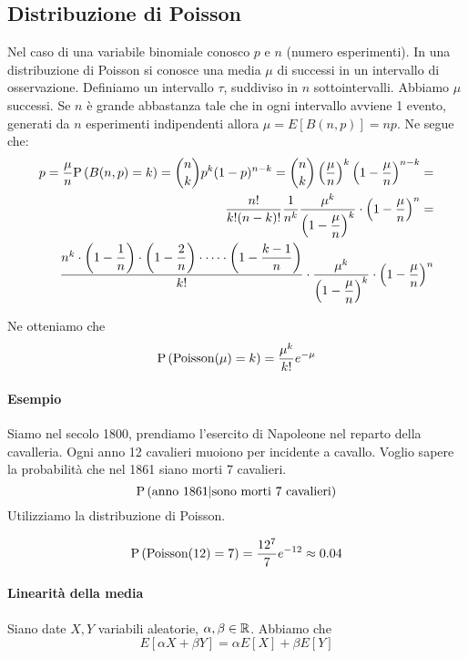 \subsection{Distribuzione di Poisson}
Nel caso di una variabile binomiale conosco $ p $ e $ n $ (numero esperimenti).
In una distribuzione di Poisson si conosce una media $ \mu $ di successi in un intervallo di osservazione.
Definiamo un intervallo $ \tau $, suddiviso in $ n $ sottointervalli. Abbiamo $ \mu $ successi. Se $ n $ è grande abbastanza tale che in ogni intervallo avviene 1 evento, generati da $ n $ esperimenti indipendenti allora $ \mu = E[B(n,p)] = np$. Ne segue che:
\[
\begin{aligned}
 p = \dfrac{\mu}{n} 
 \text{P}\left(B(n,p) = k\right) = \binom{n}{k}p^k(1-p)^{n-k} = \binom{n}{k} \left(\dfrac{\mu}{n}\right)^k \left(1- \dfrac{\mu}{n}\right)^{n-k} 
 = \\ \dfrac{n!}{k!(n-k)!} \dfrac{1}{n^k} \dfrac{\mu^k}{\left(1-\dfrac{\mu}{n}\right)^k} \cdot \left(1-\dfrac{\mu}{n}\right)^n  
 = \\ \dfrac{n^k \cdot \left(1-\dfrac{1}{n} \right) \cdot \left(1-\dfrac{2}{n}\right) \cdot \dots \cdot \left(1- \dfrac{k-1}{n}\right)}{k!} \cdot \dfrac{\mu^k}{\left(1-\dfrac{\mu}{n}\right)^k} \cdot \left(1-\dfrac{\mu}{n}\right)^n 
\end{aligned}\]

Ne otteniamo che 
\[ \text{P}\left(\text{Poisson}(\mu) = k\right) = \dfrac{\mu^k}{k!} e^{-\mu} \]


\paragraph{Esempio}
Siamo nel secolo 1800, prendiamo l'esercito di Napoleone nel reparto della cavalleria. Ogni anno 12 cavalieri muoiono per incidente a cavallo. Voglio sapere la probabilità che nel 1861 siano morti 7 cavalieri.
\[ \text{P}\left(\text{anno } 1861 | \text{sono morti 7 cavalieri}\right) \]
Utilizziamo la distribuzione di Poisson.

\[ \text{P}\left(\text{Poisson}(12) = 7\right) = \dfrac{12^7}{7}e^{-12} \approx 0.04  \]


\paragraph{Linearità della media}

Siano date $ X,Y $ variabili aleatorie, $ \alpha ,\beta \in \mathbb{R} $. Abbiamo che
\[ E[\alpha X + \beta Y] = \alpha E[X] + \beta E[Y] \]


